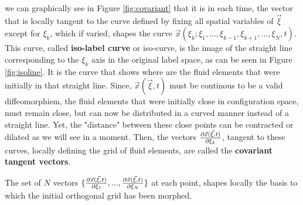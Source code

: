 \documentclass[11pt, a4paper]{article} %
\begin{document}
we can graphically see in Figure \ref{fig:covariant} that it is in each time, the vector that is locally tangent to the curve defined by fixing all spatial variables of $\vec{\xi}$ except for $\xi_k$, which if varied, shapes the curve $\vec{x}(\xi_k;\xi_1,...,\xi_{k-1},\xi_{k+1},...,\xi_N,t)$. This curve, called {\bf iso-label curve} or iso-curve, is the image of the straight line corresponding to the $\xi_k$ axis in the original label space, as can be seen in Figure \ref{fig:isoline}. It is the curve that shows where are the fluid elements that were initially in that straight line. Since, $\vec{x}(\vec{\xi},t)$ must be continous to be a valid diffeomorphism, the fluid elements that were initially close in configuration space, must remain close, but can now be distributed in a curved manner instead of a straight line. Yet, the "distance" between these close points can be contracted or dilated as we will see in a moment. Then, the vectors $\pdv{\vec{x}(\vec{\xi},t)}{\xi_k}$, tangent to these curves, locally defining the grid of fluid elements, are called the {\bf covariant tangent vectors}.

The set of $N$ vectors $\{\pdv{\vec{x}(\vec{\xi},t)}{\xi_1},...,\pdv{\vec{x}(\vec{\xi},t)}{\xi_N} \}$ at each point, shapes locally the basis to which the initial orthogonal grid has been morphed.
\end{document}
